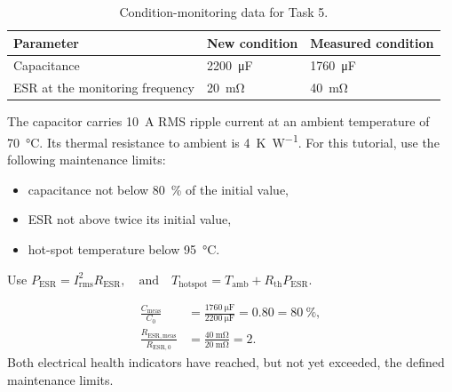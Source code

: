 \begin{table}[ht]
    \centering
    \begin{tabular}{lll}
        \toprule
        Parameter & New condition & Measured condition \\
        \midrule
        Capacitance & \SI{2200}{\micro\farad} & \SI{1760}{\micro\farad} \\
        ESR at the monitoring frequency & \SI{20}{\milli\ohm} & \SI{40}{\milli\ohm} \\
        \bottomrule
    \end{tabular}
    \caption{Condition-monitoring data for Task 5.}
    \label{table:capacitor_task5_data}
\end{table}

The capacitor carries \SI{10}{\ampere} RMS ripple current at an ambient
temperature of \SI{70}{\degreeCelsius}. Its thermal resistance to ambient is
\SI{4}{\kelvin\per\watt}. For this tutorial, use the following maintenance limits:

\begin{itemize}
    \setlength{\itemsep}{-2pt} %
    \setlength{\parskip}{-2pt} %
    \item capacitance not below \SI{80}{\percent} of the initial value,
    \item ESR not above twice its initial value,
    \item hot-spot temperature below \SI{95}{\degreeCelsius}.
\end{itemize}

Use $P_\mathrm{ESR}=I_\mathrm{rms}^2R_\mathrm{ESR}, \quad \text{and} \quad
    T_\mathrm{hotspot}=T_\mathrm{amb}+R_\mathrm{th}P_\mathrm{ESR}$.


\begin{solutionblock}
    \begin{align}
        \frac{C_\mathrm{meas}}{C_0}
        &=\frac{\SI{1760}{\micro\farad}}{\SI{2200}{\micro\farad}}
        =0.80=\SI{80}{\percent},\\
        \frac{R_\mathrm{ESR,meas}}{R_\mathrm{ESR,0}}
        &=\frac{\SI{40}{\milli\ohm}}{\SI{20}{\milli\ohm}}=2.
    \end{align}
    Both electrical health indicators have reached, but not yet exceeded, the
    defined maintenance limits.
\end{solutionblock}

